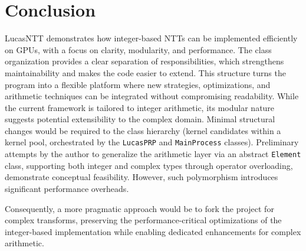 \documentclass{article}
\begin{document}
\newpage
\section{Conclusion}

LucasNTT demonstrates how integer-based NTTs can be implemented efficiently on GPUs, with a focus on clarity, modularity, and performance. The class organization provides a clear separation of responsibilities, which strengthens maintainability and makes the code easier to extend. This structure turns the program into a flexible platform where new strategies, optimizations, and arithmetic techniques can be integrated without compromising readability. 
While the current framework is tailored to integer arithmetic, its modular nature suggests potential extensibility to the complex domain. Minimal structural changes would be required to the class hierarchy (kernel candidates within a kernel pool, orchestrated by the \texttt{LucasPRP} and \texttt{MainProcess} classes). Preliminary attempts by the author to generalize the arithmetic layer via an abstract \texttt{Element} class, supporting both integer and complex types through operator overloading, demonstrate conceptual feasibility. However, such polymorphism introduces significant performance overheads.

Consequently, a more pragmatic approach would be to fork the project for complex transforms, preserving the performance-critical optimizations of the integer-based implementation while enabling dedicated enhancements for complex arithmetic.

\newpage
  

\end{document}
